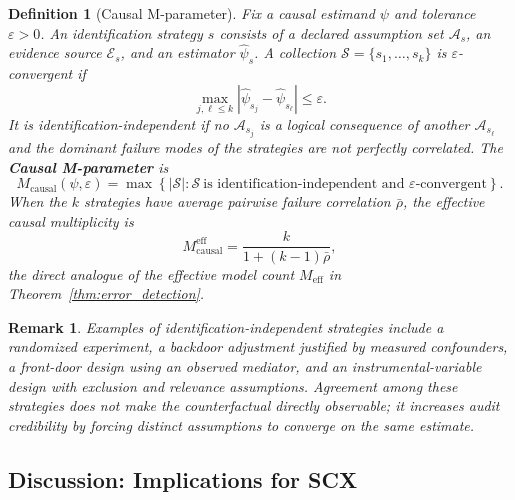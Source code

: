 \documentclass[12pt,a4paper]{article}
\newtheorem{definition}[theorem]{Definition}
\newtheorem{remark}[theorem]{Remark}
\begin{document}
\begin{definition}[Causal M-parameter]
\label{def:causal_m_parameter}
Fix a causal estimand $\psi$ and tolerance $\varepsilon>0$.  An identification
strategy $s$ consists of a declared assumption set $\mathcal{A}_s$, an evidence
source $\mathcal{E}_s$, and an estimator $\widehat{\psi}_s$.  A collection
$\mathcal{S}=\{s_1,\ldots,s_k\}$ is $\varepsilon$-convergent if
\begin{equation}
    \max_{j,\ell \leq k}
    \left|\widehat{\psi}_{s_j}-\widehat{\psi}_{s_\ell}\right|
    \leq \varepsilon.
    \label{eq:causal_convergence}
\end{equation}
It is identification-independent if no $\mathcal{A}_{s_j}$ is a logical
consequence of another $\mathcal{A}_{s_\ell}$ and the dominant failure modes
of the strategies are not perfectly correlated.  The \textbf{Causal
M-parameter} is
\begin{equation}
    M_{\mathrm{causal}}(\psi,\varepsilon)
    =
    \max\left\{|\mathcal{S}|:
    \mathcal{S}\ \text{is identification-independent and }
    \varepsilon\text{-convergent}\right\}.
    \label{eq:causal_m_parameter}
\end{equation}
When the $k$ strategies have average pairwise failure correlation
$\bar{\rho}$, the effective causal multiplicity is
\begin{equation}
    M_{\mathrm{causal}}^{\mathrm{eff}}
    =
    \frac{k}{1+(k-1)\bar{\rho}},
    \label{eq:causal_m_eff}
\end{equation}
the direct analogue of the effective model count
$M_{\mathrm{eff}}$ in Theorem~\ref{thm:error_detection}.
\end{definition}

\begin{remark}
Examples of identification-independent strategies include a randomized
experiment, a backdoor adjustment justified by measured confounders, a
front-door design using an observed mediator, and an instrumental-variable
design with exclusion and relevance assumptions.  Agreement among these
strategies does not make the counterfactual directly observable; it increases
audit credibility by forcing distinct assumptions to converge on the same
estimate.
\end{remark}

\subsection{Discussion: Implications for SCX}
\end{document}
